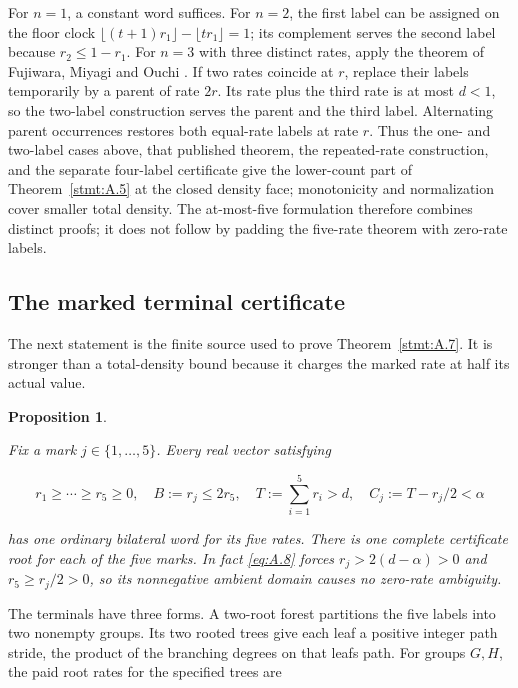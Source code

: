 \documentclass[11pt,a4paper]{article}
\newtheorem{proposition}[theorem]{Proposition}
\begin{document}
For \(n=1\), a constant word suffices. For \(n=2\), the first label can be assigned on the floor clock \(\lfloor(t+1)r_1\rfloor-\lfloor tr_1\rfloor=1\); its complement serves the second label because \(r_2\le1-r_1\). For \(n=3\) with three distinct rates, apply the theorem of Fujiwara, Miyagi and Ouchi \cite{fujiwara-miyagi-ouchi}. If two rates coincide at \(r\), replace their labels temporarily by a parent of rate \(2r\). Its rate plus the third rate is at most \(d<1\), so the two-label construction serves the parent and the third label. Alternating parent occurrences restores both equal-rate labels at rate \(r\). Thus the one- and two-label cases above, that published theorem, the repeated-rate construction, and the separate four-label certificate give the lower-count part of Theorem~\ref{stmt:A.5} at the closed density face; monotonicity and normalization cover smaller total density. The at-most-five formulation therefore combines distinct proofs; it does not follow by padding the five-rate theorem with zero-rate labels.

\subsection{The marked terminal certificate}\label{sec:A.3}

The next statement is the finite source used to prove Theorem~\ref{stmt:A.7}. It is stronger than a total-density bound because it charges the marked rate at half its actual value.

\begin{proposition}\label{stmt:A.6}

 Fix a mark \(j\in\{1,\ldots,5\}\). Every real vector satisfying

\begin{equation}
r_1\ge\cdots\ge r_5\ge0,\quad B:=r_j\le2r_5,\quad
T:=\sum_{i=1}^5r_i>d,\quad C_j:=T-r_j/2<\alpha
\tag{A.8}\label{eq:A.8}
\end{equation}

has one ordinary bilateral word for its five rates. There is one complete certificate root for each of the five marks. In fact \eqref{eq:A.8} forces \(r_j>2(d-\alpha)>0\) and \(r_5\ge r_j/2>0\), so its nonnegative ambient domain causes no zero-rate ambiguity.

\end{proposition}

The terminals have three forms. A two-root forest partitions the five labels into two nonempty groups. Its two rooted trees give each leaf a positive integer path stride, the product of the branching degrees on that leaf\textquotesingle s path. For groups \(G,H\), the paid root rates for the specified trees are
\end{document}
